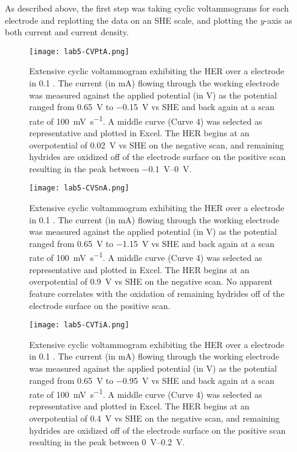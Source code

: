 \documentclass[../labs.tex]{subfiles}
\begin{document}
As described above, the first step was taking cyclic voltammograms for each electrode and replotting the data on an SHE scale, and plotting the $y$-axis as both current and current density.

\begin{figure}[H]
    \centering
    \texttt{[image: lab5-CVPtA.png]}
    \caption{Extensive cyclic voltammogram exhibiting the HER over a  electrode in \SI{0.1}{\molar} . The current (in \si{\milli\ampere}) flowing through the working electrode was measured against the applied potential (in \si{\volt}) as the potential ranged from \SI{0.65}{\volt} to \SI{-0.15}{\volt} vs SHE and back again at a scan rate of \SI[per-mode=symbol]{100}{\milli\volt\per\second}. A middle curve (Curve 4) was selected as representative and plotted in Excel. The HER begins at an overpotential of \SI{0.02}{\volt} vs SHE on the negative scan, and remaining hydrides are oxidized off of the electrode surface on the positive scan resulting in the peak between \SIrange{-0.1}{0}{\volt}.}
    \label{fig:CVPtA}
\end{figure}

\begin{figure}[H]
    \centering
    \texttt{[image: lab5-CVSnA.png]}
    \caption{Extensive cyclic voltammogram exhibiting the HER over a  electrode in \SI{0.1}{\molar} . The current (in \si{\milli\ampere}) flowing through the working electrode was measured against the applied potential (in \si{\volt}) as the potential ranged from \SI{0.65}{\volt} to \SI{-1.15}{\volt} vs SHE and back again at a scan rate of \SI[per-mode=symbol]{100}{\milli\volt\per\second}. A middle curve (Curve 4) was selected as representative and plotted in Excel. The HER begins at an overpotential of \SI{0.9}{\volt} vs SHE on the negative scan. No apparent feature correlates with the oxidation of remaining hydrides off of the electrode surface on the positive scan.}
    \label{fig:CVSnA}
\end{figure}

\begin{figure}[H]
    \centering
    \texttt{[image: lab5-CVTiA.png]}
    \caption{Extensive cyclic voltammogram exhibiting the HER over a  electrode in \SI{0.1}{\molar} . The current (in \si{\milli\ampere}) flowing through the working electrode was measured against the applied potential (in \si{\volt}) as the potential ranged from \SI{0.65}{\volt} to \SI{-0.95}{\volt} vs SHE and back again at a scan rate of \SI[per-mode=symbol]{100}{\milli\volt\per\second}. A middle curve (Curve 4) was selected as representative and plotted in Excel. The HER begins at an overpotential of \SI{0.4}{\volt} vs SHE on the negative scan, and remaining hydrides are oxidized off of the electrode surface on the positive scan resulting in the peak between \SIrange{0}{0.2}{\volt}.}
    \label{fig:CVTiA}
\end{figure}
\end{document}
